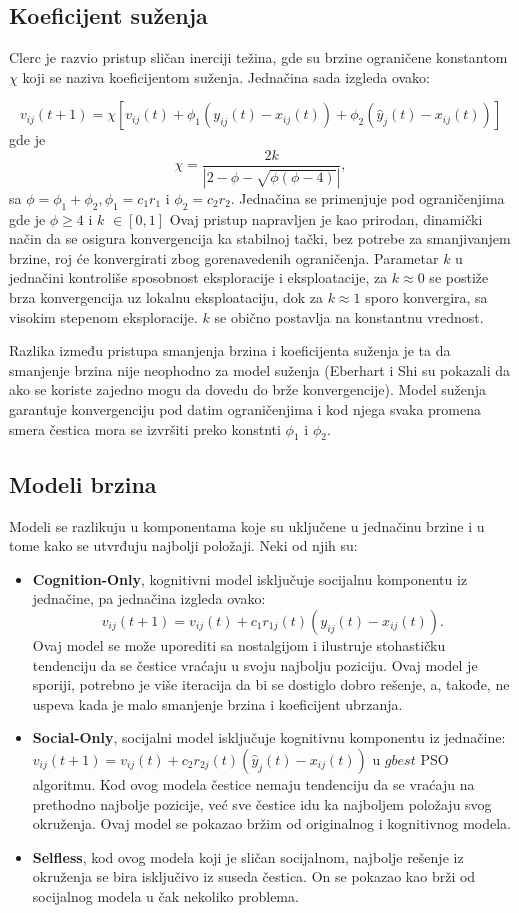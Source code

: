 \documentclass[a4paper]{article}
\begin{document}
\subsection{Koeficijent suženja}
Clerc je razvio pristup sličan inerciji težina, gde su brzine ograničene konstantom $\chi$ koji se naziva koeficijentom suženja. Jednačina sada izgleda ovako:

\[v_{ij} (t + 1) = \chi[v_{ij} (t) + \phi_1 (y_{ij} (t) - x_{ij} (t)) + \phi_2 (\hat{y}_j (t) - x_{ij} (t))]\]
gde je $$\chi = \frac{2k}{|2-\phi-\sqrt{\phi(\phi-4)}|},$$sa $\phi = \phi_1 +  \phi_2 , \phi_1 = c_1r_1$ i $\phi_2 = c_2r_2$.
Jednačina se primenjuje pod ograničenjima gde je $\phi \geq 4$ i $k$ $\in [0, 1]$
Ovaj pristup napravljen je kao prirodan, dinamički način da se osigura konvergencija ka stabilnoj tački, bez potrebe za smanjivanjem brzine, roj će konvergirati zbog gorenavedenih ograničenja.
Parametar $k$ u jednačini kontroliše sposobnost eksploracije i eksploatacije, za $k \approx 0$ se postiže brza konvergencija uz lokalnu eksploataciju, dok za  $k \approx 1$ sporo konvergira, sa visokim stepenom eksploracije. $k$ se obično postavlja na konstantnu vrednost.

Razlika između pristupa smanjenja brzina i koeficijenta suženja je ta da smanjenje brzina nije neophodno za model suženja (Eberhart i Shi su pokazali da ako se koriste zajedno mogu da dovedu do brže konvergencije). Model suženja garantuje konvergenciju pod datim ograničenjima i kod njega svaka promena smera čestica mora se izvršiti preko konstnti $\phi_1$ i $\phi_2$.

\subsection{Modeli brzina}
Modeli se razlikuju u komponentama koje su uključene u jednačinu brzine i u tome kako se utvrđuju najbolji položaji. Neki od njih su:
\begin{itemize}
    \item \textbf{Cognition-Only}, kognitivni model isključuje socijalnu komponentu iz jednačine, pa jednačina izgleda ovako: $$v_{ij} (t + 1) = v_{ij} (t) + c_1r_{1j} (t)(y_{ij} (t) - x_{ij} (t)).$$ Ovaj model se može uporediti sa nostalgijom i ilustruje stohastičku tendenciju  da se čestice vraćaju u svoju najbolju poziciju. Ovaj model je sporiji, potrebno je više iteracija da bi se dostiglo dobro rešenje, a, takođe, ne uspeva kada je malo smanjenje brzina i koeficijent ubrzanja.
    \item \textbf{Social-Only}, socijalni model isključuje kognitivnu komponentu iz jednačine: $v_{ij} (t + 1) = v_{ij} (t) + c_2r_{2j} (t)(\hat{y}_j (t) - x_{ij} (t))$ u $gbest$ PSO algoritmu. Kod ovog modela čestice nemaju tendenciju da se vraćaju na prethodno najbolje pozicije, već sve čestice idu ka najboljem položaju svog okruženja. Ovaj model se pokazao bržim od originalnog i kognitivnog modela.
    \item \textbf{Selfless}, kod ovog modela koji je sličan socijalnom, najbolje rešenje iz okruženja se bira isključivo iz suseda čestica. On se pokazao kao brži od socijalnog modela u čak nekoliko problema.
\end{itemize}
\end{document}
